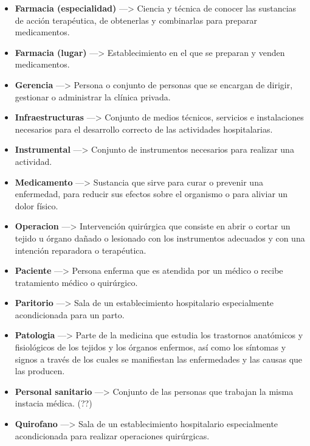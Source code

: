 \documentclass[11pt,a4paper]{article}
\begin{document}
\begin{itemize}
	\item \textbf{Farmacia (especialidad)} ---> Ciencia y técnica de conocer las sustancias de acción terapéutica, de obtenerlas y combinarlas para preparar medicamentos.
	
	\item \textbf{Farmacia (lugar)} ---> Establecimiento en el que se preparan y venden medicamentos.
	
	\item \textbf{Gerencia} ---> Persona o conjunto de personas que se encargan de dirigir, gestionar o administrar la clínica privada.
	
	\item \textbf{Infraestructuras} ---> Conjunto de medios técnicos, servicios e instalaciones necesarios para el desarrollo correcto de las actividades hospitalarias.
	
	\item \textbf{Instrumental} ---> Conjunto de instrumentos necesarios para realizar una actividad.
	
	\item \textbf{Medicamento} ---> Sustancia que sirve para curar o prevenir una enfermedad, para reducir sus efectos sobre el organismo o para aliviar un dolor físico.
	
	\item \textbf{Operacion} ---> Intervención quirúrgica que consiste en abrir o cortar un tejido u órgano dañado o lesionado con los instrumentos adecuados y con una intención reparadora o terapéutica.
	
	\item \textbf{Paciente} ---> Persona enferma que es atendida por un médico o recibe tratamiento médico o quirúrgico.
	
	\item \textbf{Paritorio} ---> Sala de un establecimiento hospitalario especialmente acondicionada para un parto.
	
	\item \textbf{Patologia} ---> Parte de la medicina que estudia los trastornos anatómicos y fisiológicos de los tejidos y los órganos enfermos, así como los síntomas y signos a través de los cuales se manifiestan las enfermedades y las causas que las producen.
	
	\item \textbf{Personal sanitario }---> Conjunto de las personas que trabajan la misma instacia médica. (??)
	
	\item \textbf{Quirofano} ---> Sala de un establecimiento hospitalario especialmente acondicionada para realizar operaciones quirúrgicas.
	

\end{itemize}
\end{document}
